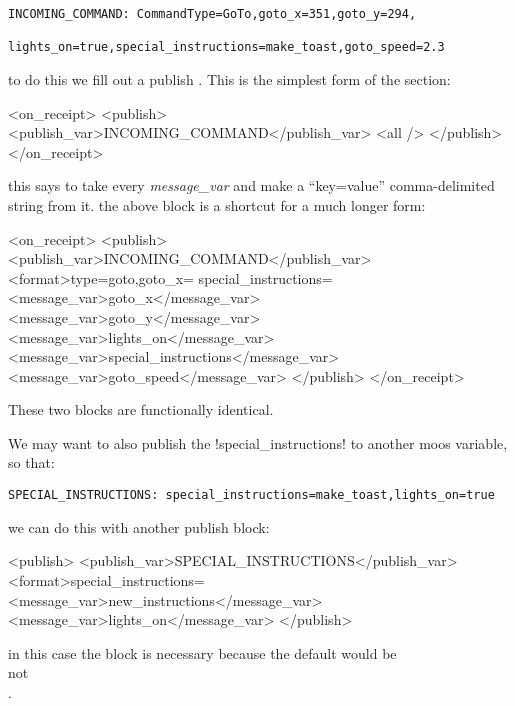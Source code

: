 \begin{enumerate}
\begin{verbatim}
INCOMING_COMMAND: CommandType=GoTo,goto_x=351,goto_y=294,
                  lights_on=true,special_instructions=make_toast,goto_speed=2.3
\end{verbatim}
to do this we fill out a publish . This is the simplest form of the  section:
\begin{small}
\begin{boxedverbatim}
    <on_receipt>
      <publish>
        <publish_var>INCOMING_COMMAND</publish_var>
        <all />
      </publish>
    </on_receipt>
\end{boxedverbatim}
\resetbvlinenumber
\end{small}
this says to take every \textit{message\_var} and make a ``key=value'' comma-delimited string from it. the above  block is a shortcut for a much longer form:
\begin{small}
\begin{boxedverbatim}
    <on_receipt>
      <publish>
        <publish_var>INCOMING_COMMAND</publish_var>
        <format>type=goto,goto_x=%
        special_instructions=%
        <message_var>goto_x</message_var>
        <message_var>goto_y</message_var>
        <message_var>lights_on</message_var>
        <message_var>special_instructions</message_var>
        <message_var>goto_speed</message_var>
      </publish>
    </on_receipt>
\end{boxedverbatim}
\resetbvlinenumber
\end{small}
These two blocks are functionally identical.

We may want to also publish the !special_instructions! to another moos variable, so that:
\begin{verbatim}
SPECIAL_INSTRUCTIONS: special_instructions=make_toast,lights_on=true
\end{verbatim}
we can do this with another publish block:
\begin{small}
\begin{boxedverbatim}
    <publish>
      <publish_var>SPECIAL_INSTRUCTIONS</publish_var>
      <format>special_instructions=%
      <message_var>new_instructions</message_var>
      <message_var>lights_on</message_var>
    </publish>
\end{boxedverbatim}
\resetbvlinenumber
\end{small}
in this case the  block is necessary because the default would be \\ 
 not \\
.
\end{enumerate}

